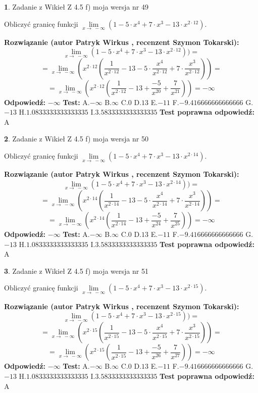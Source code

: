 \documentclass[12pt, a4paper]{article}
\theoremstyle{definition} %
\newtheorem{zad}{}
\newcommand{\zadStart}[1]{\begin{zad}#1\newline}
\newcommand{\zadStop}{\end{zad}}
\newcommand{\rozwStart}[2]{\noindent \textbf{Rozwiązanie (autor #1 , recenzent #2): }\newline}
\newcommand{\rozwStop}{\newline}
\newcommand{\odpStart}{\noindent \textbf{Odpowiedź:}\newline}
\newcommand{\odpStop}{\newline}
\newcommand{\testStart}{\noindent \textbf{Test:}\newline}
\newcommand{\testStop}{\newline}
\newcommand{\kluczStart}{\noindent \textbf{Test poprawna odpowiedź:}\newline}
\newcommand{\kluczStop}{\newline}
\begin{document}
\zadStart{Zadanie z Wikieł Z 4.5 f) moja wersja nr 49}


Obliczyć granicę funkcji  $\lim\limits_{x\to\ -\infty}(1 - 5 \cdot x^{4}+7 \cdot x^{3}- 13 \cdot x^{2\cdot12})$.
\zadStop
\rozwStart{Patryk Wirkus}{Szymon Tokarski}
$$\lim\limits_{x\to\ -\infty}(1 - 5 \cdot x^{4}+7 \cdot x^{3}- 13 \cdot x^{2\cdot12}))=$$
$$=\lim\limits_{x\to\ -\infty}(x^{2\cdot12}(\frac{1}{x^{2\cdot12}}-13 -5 \cdot \frac{x^{4}}{x^{2\cdot12}}+7 \cdot \frac{x^{3}}{x^{2\cdot12}}))=$$
$$=\lim\limits_{x\to\ -\infty}(x^{2\cdot12}(\frac{1}{x^{2\cdot12}}-13 + \frac{-5}{x^{20}}+ \frac{7}{x^{21}}))=-\infty$$
\rozwStop
\odpStart
$-\infty$
\odpStop
\testStart
A.$-\infty$ B.$\infty$ C.$0$ D.$13$ E.$-11$
F.$-9.416666666666666$ G.$-13$
H.$1.0833333333333335$
I.$3.5833333333333335$
\testStop
\kluczStart
A
\kluczStop



\zadStart{Zadanie z Wikieł Z 4.5 f) moja wersja nr 50}


Obliczyć granicę funkcji  $\lim\limits_{x\to\ -\infty}(1 - 5 \cdot x^{4}+7 \cdot x^{3}- 13 \cdot x^{2\cdot14})$.
\zadStop
\rozwStart{Patryk Wirkus}{Szymon Tokarski}
$$\lim\limits_{x\to\ -\infty}(1 - 5 \cdot x^{4}+7 \cdot x^{3}- 13 \cdot x^{2\cdot14}))=$$
$$=\lim\limits_{x\to\ -\infty}(x^{2\cdot14}(\frac{1}{x^{2\cdot14}}-13 -5 \cdot \frac{x^{4}}{x^{2\cdot14}}+7 \cdot \frac{x^{3}}{x^{2\cdot14}}))=$$
$$=\lim\limits_{x\to\ -\infty}(x^{2\cdot14}(\frac{1}{x^{2\cdot14}}-13 + \frac{-5}{x^{24}}+ \frac{7}{x^{25}}))=-\infty$$
\rozwStop
\odpStart
$-\infty$
\odpStop
\testStart
A.$-\infty$ B.$\infty$ C.$0$ D.$13$ E.$-11$
F.$-9.416666666666666$ G.$-13$
H.$1.0833333333333335$
I.$3.5833333333333335$
\testStop
\kluczStart
A
\kluczStop



\zadStart{Zadanie z Wikieł Z 4.5 f) moja wersja nr 51}


Obliczyć granicę funkcji  $\lim\limits_{x\to\ -\infty}(1 - 5 \cdot x^{4}+7 \cdot x^{3}- 13 \cdot x^{2\cdot15})$.
\zadStop
\rozwStart{Patryk Wirkus}{Szymon Tokarski}
$$\lim\limits_{x\to\ -\infty}(1 - 5 \cdot x^{4}+7 \cdot x^{3}- 13 \cdot x^{2\cdot15}))=$$
$$=\lim\limits_{x\to\ -\infty}(x^{2\cdot15}(\frac{1}{x^{2\cdot15}}-13 -5 \cdot \frac{x^{4}}{x^{2\cdot15}}+7 \cdot \frac{x^{3}}{x^{2\cdot15}}))=$$
$$=\lim\limits_{x\to\ -\infty}(x^{2\cdot15}(\frac{1}{x^{2\cdot15}}-13 + \frac{-5}{x^{26}}+ \frac{7}{x^{27}}))=-\infty$$
\rozwStop
\odpStart
$-\infty$
\odpStop
\testStart
A.$-\infty$ B.$\infty$ C.$0$ D.$13$ E.$-11$
F.$-9.416666666666666$ G.$-13$
H.$1.0833333333333335$
I.$3.5833333333333335$
\testStop
\kluczStart
A
\kluczStop
\end{document}

